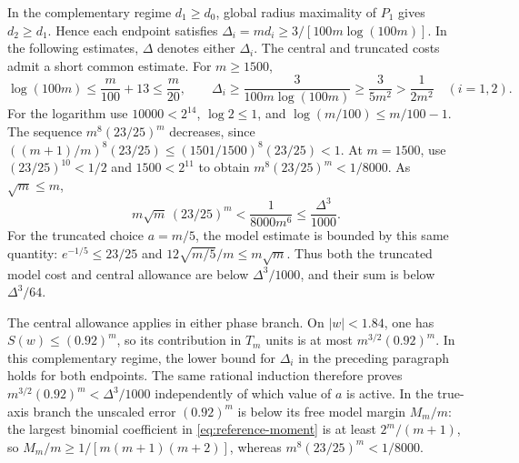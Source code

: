 \documentclass[11pt]{article}
\begin{document}
	In the complementary regime $d_1\geq d_0$, global radius maximality
	of $P_1$ gives $d_2\geq d_1$.  Hence each endpoint satisfies
	$\Delta_i=md_i\geq 3/[100m\log(100m)]$.
	In the following estimates, $\Delta$ denotes either $\Delta_i$.
	The central and truncated costs admit a short common estimate.
	For $m\geq1500$,
	\[
	\log(100m)\leq\frac m{100}+13\leq\frac m{20},
	\qquad \Delta_i\geq\frac{3}{100m\log(100m)}
	\geq\frac{3}{5m^2}>\frac1{2m^2}
	\quad(i=1,2).
	\]
	For the logarithm use $10000<2^{14}$, $\log2\leq1$, and
	$\log(m/100)\leq m/100-1$.
	The sequence $m^8(23/25)^m$ decreases, since
	$((m+1)/m)^8(23/25)\leq(1501/1500)^8(23/25)<1$.
	At $m=1500$, use $(23/25)^{10}<1/2$ and $1500<2^{11}$
	to obtain $m^8(23/25)^m<1/8000$.  As $\sqrt m\leq m$,
	\[
	m\sqrt m\,(23/25)^m<\frac1{8000m^6}
	\leq\frac{\Delta^3}{1000}.
	\]
	For the truncated choice $a=m/5$, the model estimate is bounded by
	this same quantity: $e^{-1/5}\leq23/25$ and
	$12\sqrt{m/5}/m\leq m\sqrt m$.
	Thus both the truncated model cost and central allowance are below
	$\Delta^3/1000$, and their sum is below $\Delta^3/64$.
	
	The central allowance applies in either phase branch.  On
	$|w|<1.84$, one has $S(w)\leq(0.92)^m$, so its contribution in
	$T_m$ units is at most $m^{3/2}(0.92)^m$.
	In this complementary regime, the lower bound for $\Delta_i$
	in the preceding paragraph holds for both endpoints.  The same
	rational induction therefore proves
	$m^{3/2}(0.92)^m<\Delta^3/1000$ independently of which value of
	$a$ is active.  In the true-axis branch the unscaled error
	$(0.92)^m$ is below its free model margin $M_m/m$: the largest
	binomial coefficient in \eqref{eq:reference-moment} is at least
	$2^m/(m+1)$, so $M_m/m\geq1/[m(m+1)(m+2)]$, whereas
	$m^8(23/25)^m<1/8000$.
	
\end{document}
